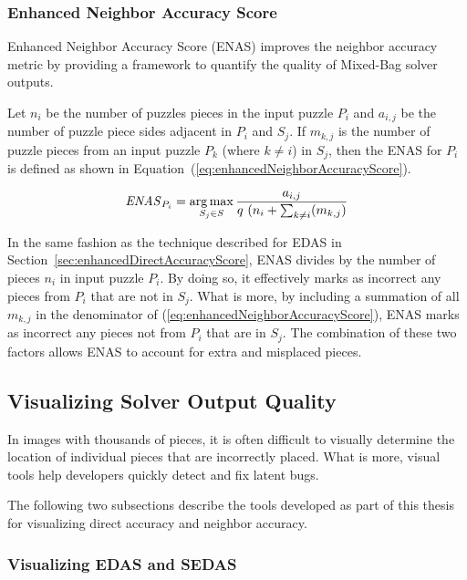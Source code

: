 \documentclass{report}
\def\eref#1{(\ref{#1})}
\newcommand{\ENAS}{\mbox{\textit{ENAS}}}
\DeclareMathOperator*{\argmax}{arg\,max} %
\begin{document}
\subsubsection{Enhanced Neighbor Accuracy Score}\label{sec:enhancedNeighborAccuracyScore}

Enhanced Neighbor Accuracy Score (ENAS) improves the neighbor accuracy metric by providing a framework to quantify the quality of Mixed-Bag solver outputs. 

Let $n_i$ be the number of puzzles pieces in the input puzzle $P_i$ and $a_{i,j}$ be the number of puzzle piece sides adjacent in $P_i$ and $S_j$.  If $m_{k,j}$ is the number of puzzle pieces from an input puzzle $P_k$ (where $k \ne i$) in $S_j$, then the ENAS for $P_i$ is defined as shown in Equation~\eref{eq:enhancedNeighborAccuracyScore}.

\begin{equation} \label{eq:enhancedNeighborAccuracyScore}
\ENAS_{P_i} = \argmax_{S_j \in S}\frac{a_{i,j}}{q ~ (n_i + \sum_{k \ne i}(m_{k,j})}
\end{equation}

In the same fashion as the technique described for EDAS in Section~\ref{sec:enhancedDirectAccuracyScore}, ENAS divides by the number of pieces $n_i$ in input puzzle $P_i$.  By doing so, it effectively marks as incorrect any pieces from $P_i$ that are not in $S_j$.  What is more, by including a summation of all $m_{k,j}$ in the denominator of \eref{eq:enhancedNeighborAccuracyScore}, ENAS marks as incorrect any pieces not from $P_i$ that are in $S_j$.  The combination of these two factors allows ENAS to account for extra and misplaced pieces.

\subsection{Visualizing Solver Output Quality}\label{sec:visualizingSolverAccuracy}

In images with thousands of pieces, it is often difficult to visually determine the location of individual pieces that are incorrectly placed.  What is more, visual tools help developers quickly detect and fix latent bugs.

The following two subsections describe the tools developed as part of this thesis for visualizing direct accuracy and neighbor accuracy.

\subsubsection{Visualizing EDAS and SEDAS}\label{sec:visualizingEdasSedas}
\end{document}
